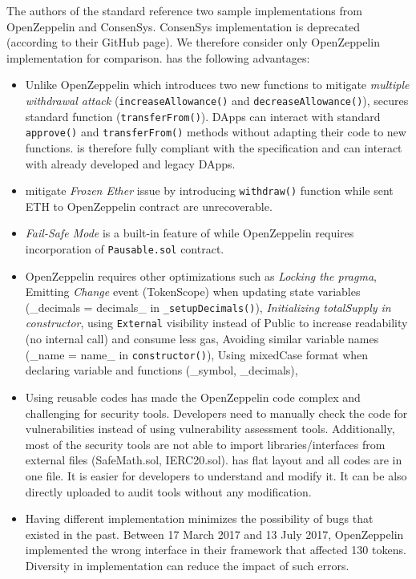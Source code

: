 {The authors of the \erc standard reference two sample implementations from OpenZeppelin\cite{OpenZepplin} and ConsenSys\cite{ConsensysToken}. ConsenSys implementation is deprecated (according to their GitHub page). We therefore consider only OpenZeppelin implementation for comparison. \sys has the following advantages:
\begin{itemize}[noitemsep,topsep=0pt]
	\item Unlike OpenZeppelin which introduces two new functions to mitigate \textit{multiple withdrawal attack} (\ie \texttt{increaseAllowance()} and \texttt{decreaseAllowance()}), \sys secures standard \erc function (\ie \texttt{transferFrom()}). DApps can interact with standard \texttt{approve()} and \texttt{transferFrom()} methods without adapting their code to new functions. \sys is therefore fully compliant with the \erc specification and can interact with already developed and legacy DApps.
	\item \sys mitigate \textit{Frozen Ether} issue by introducing \texttt{withdraw()} function while sent ETH to OpenZeppelin contract are unrecoverable.
	\item \textit{Fail-Safe Mode} is a built-in feature of \sys while OpenZeppelin requires incorporation of \texttt{Pausable.sol} contract.
	\item OpenZeppelin requires other optimizations such as \textit{Locking the pragma}, Emitting \textit{Change} event (\cf TokenScope\cite{TokenScope}) when updating state variables (\eg \_decimals = decimals\_ in \texttt{\_setupDecimals()}), \textit{Initializing totalSupply in constructor}, using \texttt{External} visibility instead of Public to increase readability (\ie no internal call) and consume less gas, Avoiding similar variable names (\eg \_name = name\_ in \texttt{constructor()}), Using mixedCase format when declaring variable and functions (\eg \_symbol, \_decimals), \etc
	\item Using reusable codes has made the OpenZeppelin code complex and challenging for security tools. Developers need to manually check the code for vulnerabilities instead of using vulnerability assessment tools. Additionally, most of the security tools are not able to import libraries/interfaces from external files (\eg SafeMath.sol, IERC20.sol). \sys has flat layout and all codes are in one file. It is easier for developers to understand and modify it. It can be also directly uploaded to audit tools without any modification.
	\item Having different \erc implementation minimizes the possibility of bugs that existed in the past. Between 17 March 2017 and 13 July 2017, OpenZeppelin implemented the wrong interface in their framework that affected 130 tokens\cite{ErcBug}. Diversity in \erc implementation can reduce the impact of such errors.
\end{itemize}
}

